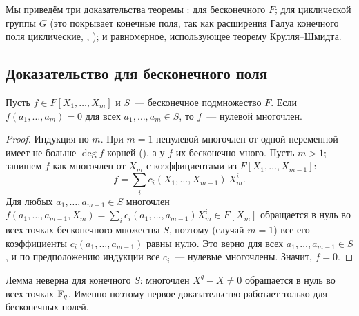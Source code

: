 Мы приведём три доказательства теоремы : для бесконечного $F$; для циклической группы $G$ (это покрывает
конечные поля, так как расширения Галуа конечного поля циклические, , ); и равномерное, использующее теорему
Крулля--Шмидта.

\subsection*{Доказательство для бесконечного поля}

\begin{lemma}[5.19]
Пусть $f\in F[X_1,\dots,X_m]$ и $S$~--- бесконечное подмножество $F$. Если $f(a_1,\dots,a_m)=0$ для всех
$a_1,\dots,a_m\in S$, то $f$~--- нулевой многочлен.
\end{lemma}

\begin{proof}
Индукция по $m$. При $m=1$ ненулевой многочлен от одной переменной имеет не больше $\deg f$ корней (), а у $f$
их бесконечно много. Пусть $m>1$; запишем $f$ как многочлен от $X_m$ с коэффициентами из $F[X_1,\dots,X_{m-1}]$:
\[
f=\sum_ic_i(X_1,\dots,X_{m-1})\,X_m^i.
\]
Для любых $a_1,\dots,a_{m-1}\in S$ многочлен $f(a_1,\dots,a_{m-1},X_m)=\sum_ic_i(a_1,\dots,a_{m-1})X_m^i\in F[X_m]$
обращается в нуль во всех точках бесконечного множества $S$, поэтому (случай $m=1$) все его коэффициенты
$c_i(a_1,\dots,a_{m-1})$ равны нулю. Это верно для всех $a_1,\dots,a_{m-1}\in S$, и по предположению индукции все
$c_i$~--- нулевые многочлены. Значит, $f=0$.
\end{proof}

Лемма неверна для конечного $S$: многочлен $X^q-X\ne0$ обращается в нуль во всех точках $\mathbb F_q$. Именно поэтому
первое доказательство работает только для бесконечных полей.


